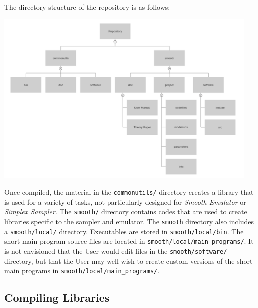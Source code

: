 \documentclass[main.tex]{subfiles}
\begin{document}
The directory structure of the repository is as follows: 

\centerline{\includegraphics[width = 0.95\textwidth]{Structure_Tree.png}}

Once compiled, the material in the {\tt commonutils/} directory creates a library that is used for a variety of tasks, not particularly designed for {\it Smooth Emulator} or {\it Simplex Sampler}. The {\tt smooth/} directory contains codes that are used to create libraries specific to the sampler and emulator. The {\tt smooth} directory also includes a {\tt smooth/local/} directory. Executables are stored in {\tt smooth/local/bin}. The short main program source files are located in {\tt smooth/local/main\_programs/}. It is not envisioned that the User would edit files in the {\tt smooth/software/} directory, but that the User may well wish to create custom versions of the short main programs in {\tt smooth/local/main\_programs/}.

\subsection{Compiling Libraries }
\end{document}
